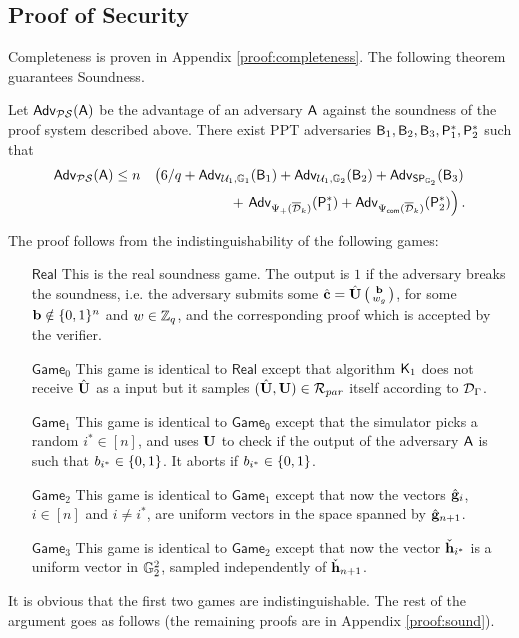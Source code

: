 %


\subsection{Proof of Security}

Completeness is proven in Appendix \ref{proof:completeness}.
The following theorem guarantees Soundness. 
 
\begin{theorem} Let $\mathsf{Adv}_{\mathcal{PS}}(\mathsf{A})$ 
be the advantage of an adversary $\mathsf{A}$ against the soundness of 
the proof system  described above. There exist PPT adversaries
$\mathsf{B}_1,\mathsf{B}_2,\mathsf{B}_3,\mathsf{P}^*_1,\mathsf{P}^*_2$ such that 
\begin{eqnarray*}
\mathsf{Adv}_{\mathcal{PS}}(\mathsf{A}) & \leq 
n& \left(6/q+ \mathsf{Adv}_{\mathcal{U}_1,\mathbb{G}_1}(\mathsf{B}_1)
+  \mathsf{Adv}_{\mathcal{U}_1,\mathbb{G}_2}(\mathsf{B}_2)
+  \mathsf{Adv}_{\mathsf{SP}_{\mathbb{G}_2}}(\mathsf{B}_3)\right. \\
& & \mbox{ } 
+  \left.\mathsf{Adv}_{{\Psi_{+}(\overline{\mathcal{D}}_k)}}(\mathsf{P}^*_1)
+
 \mathsf{Adv}_{{{\Psi_{\mathsf{com}}(\overline{\mathcal{D}}_k)}}}(\mathsf{P}^*_2)\right).
\end{eqnarray*}
\label{teo:bitstr-soundness}
\end{theorem}

The proof follows from the indistinguishability of the following games:
\begin{itemize}
\item [$\mathsf{Real}$] This is the real soundness game. 
 The output is $1$ if  the adversary breaks the soundness,
i.e. the adversary submits
some ${\hat{\mathbf{c}}} = {\hat{\mathbf{{U}}}}\left(\begin{smallmatrix}\mathbf{b}\\ w_g\end{smallmatrix}\right)$, for some
$\mathbf{b}\notin \{0,1\}^n$ and $w \in \mathbb{Z}_q$, and
the corresponding proof which is accepted by the verifier.
\item[$\mathsf{Game}_0$] This game is identical to 
$\mathsf{Real}$ except that algorithm $\mathsf{K}_1$ does not receive ${\hat{\mathbf{{U}}}}$ as a input but it samples
$({\hat{\mathbf{{U}}}},\mathbf{{U}}) \in \mathcal{R}_{par}$
itself according to $\mathcal{D}_{\Gamma}$.
\item[$\mathsf{Game}_1$] This game is identical to 
$\mathsf{Game_0}$ except that the simulator picks a random $i^* \in [n]$, and uses $\mathbf{{U}}$ to check  
    if the output of the adversary $\mathsf{A}$ is such that 
    $b_{i^*}\in \{0,1\}$.  It aborts if  $b_{i^*}\in \{0,1\}$.
\item[$\mathsf{Game}_{2}$] This game is identical to 
$\mathsf{Game}_1$ except that now the vectors $\hat{\mathbf{g}}_{i}$, $i \in [n]$ and $i \neq i^*$,
are uniform vectors in the space spanned by $\hat{\mathbf{g}}_{n+1}$.   
\item[$\mathsf{Game}_{3}$] This game is identical to 
$\mathsf{Game}_2$ except that now the vector $\check{\mathbf{h}}_{i^*}$ is 
a uniform vector in $\mathbb{G}_2^2$, sampled independently of 
$\check{\mathbf{h}}_{n+1}$.     
\end{itemize}
It is obvious that the first two games are indistinguishable. 
The rest of the argument goes as follows (the remaining proofs are in Appendix \ref{proof:sound}). 

